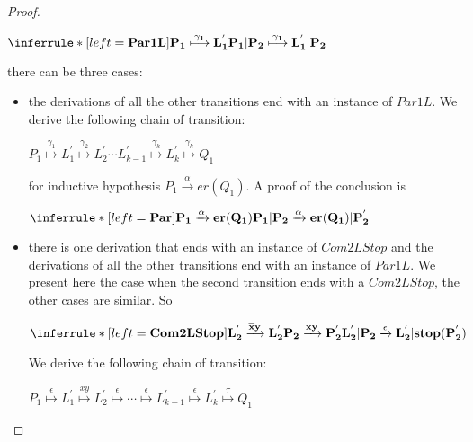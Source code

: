 \begin{proposition}
\begin{proof}
\begin{description}
\begin{description}
	    \begin{center}
	      $\inferrule* [left=\bf{Par1L}]{
		      P_{1} \stackrel{\gamma_{1}}{\longmapsto} L_{1}^{'}
		  }{
		    P_{1}|P_{2} \stackrel{\gamma_{1}}{\longmapsto} L_{1}^{'}|P_{2}
	      }$
	    \end{center}
	    there can be three cases:
	    \begin{itemize}
	      \item 
		the derivations of all the other transitions end with an instance of $Par1L$. We derive the following chain of transition:
 		    \begin{center}
 		      $P_{1} 
 			\stackrel{\gamma_{1}}{\longmapsto} 
 			  L_{1}^{'} 
 			    \stackrel{\gamma_{2}}{\longmapsto} 
 			      L_{2}^{'} 
 				\cdots 
 				  L_{k-1}^{'} 
 				    \stackrel{\gamma_{k}}{\longmapsto} 
 				      L_{k}^{'}
 					\stackrel{\gamma_{k}}{\longmapsto} 
 					  Q_{1}$
 		    \end{center}
 		    for inductive hypothesis $P_{1} \xrightarrow{\alpha} er(Q_{1})$. A proof of the conclusion is
 		    \begin{center}
 		      $\inferrule* [left=\bf{Par}]{
			  P_{1} \xrightarrow{\alpha} er(Q_{1})
 		      }{
 			P_{1}|P_{2} \xrightarrow{\alpha} er(Q_{1})|P_{2}^{'}
 		      }$ 
 		    \end{center}
	      \item 
		there is one derivation that ends with an instance of $Com2LStop$ and the derivations of all the other transitions end with an instance of $Par1L$. We present here the case when the second transition ends with a $Com2LStop$, the other cases are similar. So  
 		    \begin{center}
 		      $\inferrule* [left=\bf{Com2LStop}]{
 			  L_{2}^{'} \xrightarrow{\overline{x}y} L_{2}^{'}
 			\\
 			  P_{2}\xrightarrow{xy} P_{2}^{'}
 		      }{
 			L_{2}^{'}|P_{2} \xrightarrow{\epsilon} L_{2}^{'}|stop(P_{2}^{'})
 		      }$ 
 		    \end{center}
		We derive the following chain of transition:
 		    \begin{center}
 		      $P_{1} 
 			\stackrel{\epsilon}{\longmapsto} 
 			  L_{1}^{'} 
 			    \stackrel{\overline{x}y}{\longmapsto} 
 			      L_{2}^{'} \stackrel{\epsilon}{\longmapsto} 
 				\cdots 
 				  \stackrel{\epsilon}{\longmapsto}  L_{k-1}^{'} 
 				    \stackrel{\epsilon}{\longmapsto} 
 				      L_{k}^{'}
 					\stackrel{\tau}{\longmapsto} 
 					  Q_{1}$
 		    \end{center}

\end{itemize}
\end{description}
\end{description}
\end{proof}
\end{proposition}
